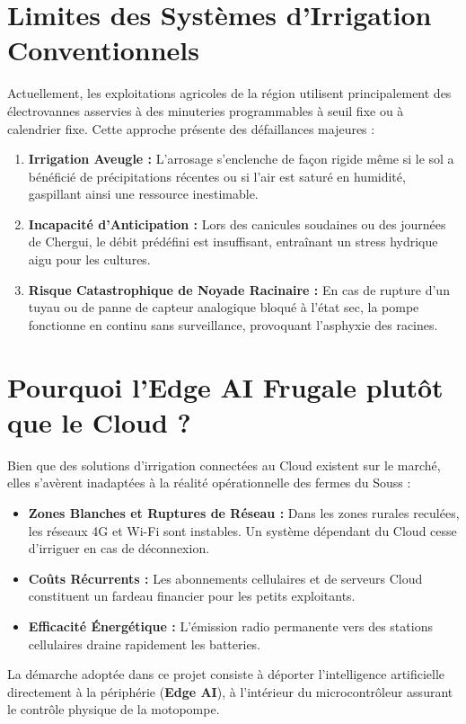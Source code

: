 \documentclass[11pt,a4paper]{report}
\begin{document}
\section{Limites des Systèmes d'Irrigation Conventionnels}
Actuellement, les exploitations agricoles de la région utilisent principalement des électrovannes asservies à des minuteries programmables à seuil fixe ou à calendrier fixe. Cette approche présente des défaillances majeures :
\begin{enumerate}
    \item \textbf{Irrigation Aveugle :} L'arrosage s'enclenche de façon rigide même si le sol a bénéficié de précipitations récentes ou si l'air est saturé en humidité, gaspillant ainsi une ressource inestimable.
    \item \textbf{Incapacité d'Anticipation :} Lors des canicules soudaines ou des journées de Chergui, le débit prédéfini est insuffisant, entraînant un stress hydrique aigu pour les cultures.
    \item \textbf{Risque Catastrophique de Noyade Racinaire :} En cas de rupture d'un tuyau ou de panne de capteur analogique bloqué à l'état sec, la pompe fonctionne en continu sans surveillance, provoquant l'asphyxie des racines.
\end{enumerate}

\section{Pourquoi l'Edge AI Frugale plutôt que le Cloud ?}
Bien que des solutions d'irrigation connectées au Cloud existent sur le marché, elles s'avèrent inadaptées à la réalité opérationnelle des fermes du Souss :
\begin{itemize}
    \item \textbf{Zones Blanches et Ruptures de Réseau :} Dans les zones rurales reculées, les réseaux 4G et Wi-Fi sont instables. Un système dépendant du Cloud cesse d'irriguer en cas de déconnexion.
    \item \textbf{Coûts Récurrents :} Les abonnements cellulaires et de serveurs Cloud constituent un fardeau financier pour les petits exploitants.
    \item \textbf{Efficacité Énergétique :} L'émission radio permanente vers des stations cellulaires draine rapidement les batteries.
\end{itemize}

La démarche adoptée dans ce projet consiste à déporter l'intelligence artificielle directement à la périphérie (\textbf{Edge AI}), à l'intérieur du microcontrôleur assurant le contrôle physique de la motopompe.
\end{document}
